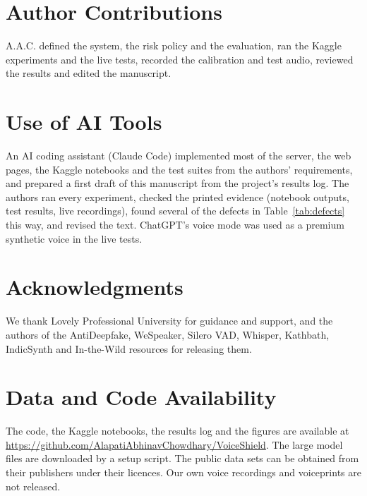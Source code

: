 \documentclass[10pt,a4paper,twocolumn]{article}
\begin{document}
\section{Author Contributions}
A.A.C. defined the system, the risk policy and the evaluation, ran the Kaggle experiments and the live tests, recorded the calibration and test audio, reviewed the results and edited the manuscript.

\section{Use of AI Tools}
An AI coding assistant (Claude Code) implemented most of the server, the web pages, the Kaggle notebooks and the test suites from the authors' requirements, and prepared a first draft of this manuscript from the project's results log. The authors ran every experiment, checked the printed evidence (notebook outputs, test results, live recordings), found several of the defects in Table~\ref{tab:defects} this way, and revised the text. ChatGPT's voice mode was used as a premium synthetic voice in the live tests.

\section{Acknowledgments}
We thank Lovely Professional University for guidance and support, and the authors of the AntiDeepfake, WeSpeaker, Silero VAD, Whisper, Kathbath, IndicSynth and In-the-Wild resources for releasing them.

\section{Data and Code Availability}
The code, the Kaggle notebooks, the results log and the figures are available at \url{https://github.com/AlapatiAbhinavChowdhary/VoiceShield}. The large model files are downloaded by a setup script. The public data sets can be obtained from their publishers under their licences. Our own voice recordings and voiceprints are not released.
\end{document}
